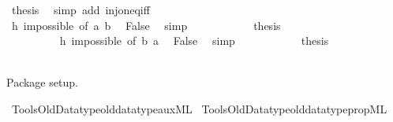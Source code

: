\begin{isabellebody}
\ {\isacharquery}{\kern0pt}thesis\ \isamarkupfalse%
\ {\isacharparenleft}{\kern0pt}simp\ add{\isacharcolon}{\kern0pt}\ inj{\isacharunderscore}{\kern0pt}on{\isacharunderscore}{\kern0pt}eq{\isacharunderscore}{\kern0pt}iff{\isacharparenright}{\kern0pt}\isanewline
\ \ \ \ \ \ \isamarkupfalse%
\isanewline
\ \ \ \ \ \ \ \ \isamarkupfalse%
\ {}\isanewline
\ \ \ \ \ \ \ \ \isamarkupfalse%
\ h\ impossible\ {\isacharbrackleft}{\kern0pt}of\ a\ b{\isacharbrackright}{\kern0pt}\ \isamarkupfalse%
\ False\ \isamarkupfalse%
\ simp\isanewline
\ \ \ \ \ \ \ \ \isamarkupfalse%
\ \isamarkupfalse%
\ {\isacharquery}{\kern0pt}thesis\ \isacommand{{\isachardot}{\kern0pt}{\isachardot}{\kern0pt}}\isamarkupfalse%
\isanewline
\ \ \ \ \ \ \isamarkupfalse%
\isanewline
\ \ \ \ \ \ \ \ \isamarkupfalse%
\ {}\isanewline
\ \ \ \ \ \ \ \ \isamarkupfalse%
\ h\ impossible\ {\isacharbrackleft}{\kern0pt}of\ b\ a{\isacharbrackright}{\kern0pt}\ \isamarkupfalse%
\ False\ \isamarkupfalse%
\ simp\isanewline
\ \ \ \ \ \ \ \ \isamarkupfalse%
\ \isamarkupfalse%
\ {\isacharquery}{\kern0pt}thesis\ \isacommand{{\isachardot}{\kern0pt}{\isachardot}{\kern0pt}}\isamarkupfalse%
\isanewline
\ \ \ \ \ \ \isamarkupfalse%
\isanewline
\ \ \ \ \isamarkupfalse%
\isanewline
\ \ \isamarkupfalse%
\isanewline
{}\isamarkupfalse%
%
\endisatagproof
{\isafoldproof}%
%
\isadelimproof
%
\endisadelimproof
%
\isadelimdocument
%
\endisadelimdocument
%
\isatagdocument
%
\isamarkuptrue%
%
\endisatagdocument
{\isafolddocument}%
%
\isadelimdocument
%
\endisadelimdocument
%
\begin{isamarkuptext}%
Package setup.%
\end{isamarkuptext}\isamarkuptrue%
%
\isadelimML
%
\endisadelimML
%
\isatagML
{}\isamarkupfalse%
\ {\isacartoucheopen}Tools{\isacharslash}{\kern0pt}Old{\isacharunderscore}{\kern0pt}Datatype{\isacharslash}{\kern0pt}old{\isacharunderscore}{\kern0pt}datatype{\isacharunderscore}{\kern0pt}aux{\isachardot}{\kern0pt}ML{\isacartoucheclose}\isanewline
{}\isamarkupfalse%
\ {\isacartoucheopen}Tools{\isacharslash}{\kern0pt}Old{\isacharunderscore}{\kern0pt}Datatype{\isacharslash}{\kern0pt}old{\isacharunderscore}{\kern0pt}datatype{\isacharunderscore}{\kern0pt}prop{\isachardot}{\kern0pt}ML{\isacartoucheclose}\isanewline

\end{isabellebody}
